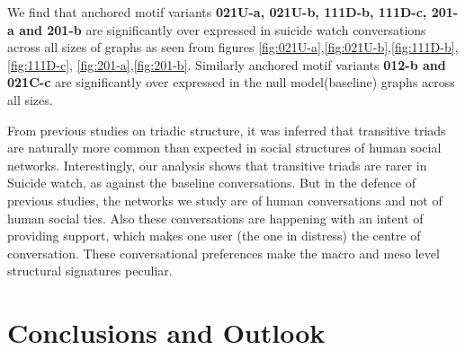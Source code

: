 We find that anchored motif variants \textbf{021U-a, 021U-b, 111D-b, 111D-c, 201-a and 201-b} are significantly over expressed in suicide watch conversations across all sizes of graphs as seen from figures \ref{fig:021U-a},\ref{fig:021U-b},\ref{fig:111D-b},\ref{fig:111D-c}, \ref{fig:201-a},\ref{fig:201-b}. Similarly anchored motif variants \textbf{012-b and 021C-c} are significantly over expressed in the null model(baseline) graphs across all sizes.

From previous studies on triadic structure, it was inferred that transitive triads are naturally more common than expected in social structures of human social networks. Interestingly, our analysis shows that transitive triads are rarer in Suicide watch, as against the baseline conversations. But in the defence of previous studies, the networks we study are of human conversations and not of human social ties. Also these conversations are happening with an intent of providing support, which makes one user (the one in distress) the centre of conversation. These conversational preferences make the macro and meso level structural signatures peculiar.

\section{Conclusions and Outlook}


